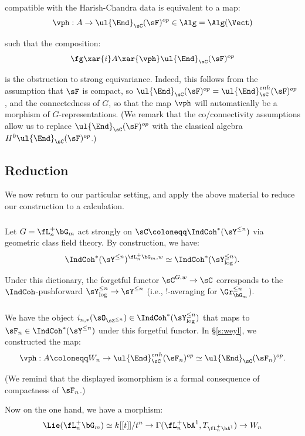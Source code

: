  compatible with the Harish-Chandra data is equivalent to
a map:
%
\[
\vph:A \to  \ul{\End}_{\sC}(\sF)^{op} \in \Alg = \Alg(\Vect)
\]

 such that the composition:
%
\[
\fg \xar{i} A \xar{\vph} \ul{\End}_{\sC}(\sF)^{op}
\]

 is the obstruction to strong equivariance. Indeed, this follows
from the assumption that $\sF$ is compact, so $\ul{\End}_{\sC}(\sF)^{op} =
\ul{\End}_{\sC}^{enh}(\sF)^{op}$, and the connectedness of $G$, so that
the map $\vph$ will automatically be a morphism of $G$-representations.
(We remark that the co/connectivity assumptions allow us to replace
$\ul{\End}_{\sC}(\sF)^{op}$ with the classical algebra
$H^0\ul{\End}_{\sC}(\sF)^{op}$.)

\subsection{Reduction}

We now return to our particular setting, and apply the above material to
reduce our construction to a calculation.

\subsubsection{}

Let $G = \fL_n^+\bG_m$ act strongly on $\sC \coloneqq \IndCoh^*(\sY^{\leq n})$
via geometric class field theory. By construction, we have:
%
\[
\IndCoh^*(\sY^{\leq n})^{\fL_n^+\bG_m,w} \simeq
\IndCoh^*(\sY_{\log}^{\leq n}).
\]

 Under this dictionary, the forgetful functor
$\sC^{G,w} \to \sC$ corresponds to the $\IndCoh$-pushforward
$\sY_{\log}^{\leq n} \to \sY^{\leq n}$ (i.e., $!$-averaging
for $\Gr_{\bG_m}^{\leq n}$).

\subsubsection{}

We have the object $i_{n,*}(\sO_{\sZ^{\leq n}}) \in \IndCoh^*(\sY_{\log}^{\leq n})$
that maps to $\sF_n \in \IndCoh^*(\sY^{\leq n})$ under this forgetful functor.
In \S \ref{s:weyl}, we constructed the map:
%
\[
\vph:A \coloneqq W_n \to \ul{\End}_{\sC}^{enh}(\sF_n)^{op} \simeq
\ul{\End}_{\sC}(\sF_n)^{op}.
\]

 (We remind that the displayed isomorphism is a formal consequence
of compactness of $\sF_n$.)

Now on the one hand, we have a morphism:
%
\[
\Lie(\fL_n^+\bG_m) \simeq k[[t]]/t^n \to \Gamma(\fL_n^+\bA^1,T_{\fL_n^+\bA^1})
\to W_n
\]

